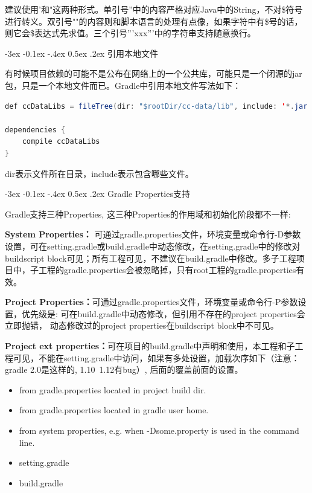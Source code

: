 \documentclass[12pt]{book}
\makeatletter
\numberwithin{dummy}{section}
\theoremstyle{ocrenumbox}
\theoremstyle{blacknumex}
\theoremstyle{blacknumbox}
\theoremstyle{ocrenum}
\renewcommand{\subsection}{\@startsection {subsection}{2}{\z@}
	{-3ex \@plus -0.1ex \@minus -.4ex}
	{0.5ex \@plus.2ex }
	{\normalfont\sffamily\bfseries}}
\makeatother
\begin{document}
建议使用'和"这两种形式。单引号''中的内容严格对应Java中的String，不对\$符号进行转义。双引号""的内容则和脚本语言的处理有点像，如果字符中有\$号的话，则它会\$表达式先求值。三个引号'''xxx'''中的字符串支持随意换行。

\subsection{引用本地文件}

有时候项目依赖的可能不是公布在网络上的一个公共库，可能只是一个闭源的jar包，只是一个本地文件而已。Gradle中引用本地文件写法如下：

\begin{lstlisting}[language=Java]
def ccDataLibs = fileTree(dir: "$rootDir/cc-data/lib", include: '*.jar')

dependencies {
	compile ccDataLibs
}
\end{lstlisting}

dir表示文件所在目录，include表示包含哪些文件。

\subsection{Gradle Properties支持}

Gradle支持三种Properties, 这三种Properties的作用域和初始化阶段都不一样:

\textbf{System Properties：}
可通过gradle.properties文件，环境变量或命令行-D参数设置，可在setting.gradle或build.gradle中动态修改，在setting.gradle中的修改对buildscript block可见；所有工程可见，不建议在build.gradle中修改。多子工程项目中，子工程的gradle.properties会被忽略掉，只有root工程的gradle.properties有效。

\textbf{Project Properties：}可通过gradle.properties文件，环境变量或命令行-P参数设置，优先级是:
可在build.gradle中动态修改，但引用不存在的project properties会立即抛错，
动态修改过的project properties在buildscript block中不可见。

\textbf{Project ext properties：}可在项目的build.gradle中声明和使用，本工程和子工程可见，不能在setting.gradle中访问，如果有多处设置，加载次序如下（注意：gradle 2.0是这样的, 1.10~1.12有bug）, 后面的覆盖前面的设置。

\begin{itemize}
	\item {from gradle.properties located in project build dir.}
	\item {from gradle.properties located in gradle user home.}
	\item {from system properties, e.g. when -Dsome.property is used in the command line.}
	\item {setting.gradle}
	\item {build.gradle}
\end{itemize}
\end{document}
